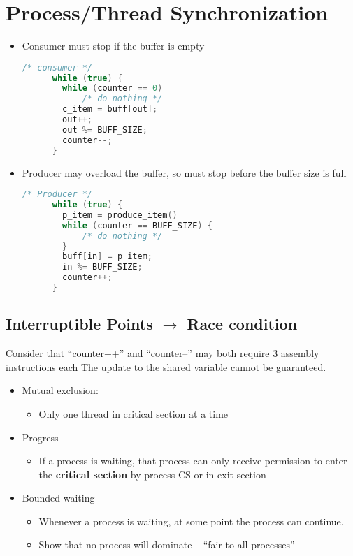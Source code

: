 \documentclass[11pt]{article}
\begin{document}
\section*{Process/Thread Synchronization}
\begin{itemize}
  \item Consumer must stop if the buffer is empty
    \begin{lstlisting}[language=c]
      /* consumer */
      while (true) {
      	while (counter == 0)
        	/* do nothing */
      	c_item = buff[out];
      	out++;
      	out %= BUFF_SIZE;
      	counter--;
      }
    \end{lstlisting}
  \item Producer may overload the buffer,
  so must stop before the buffer size is full
    \begin{lstlisting}[language=c]
      /* Producer */
      while (true) {
        p_item = produce_item()
        while (counter == BUFF_SIZE) {
        	/* do nothing */
        }
        buff[in] = p_item;
        in %= BUFF_SIZE;
        counter++;
      }
    \end{lstlisting}
\end{itemize}

\subsection*{Interruptible Points $\rightarrow$ Race condition}
Consider that “counter++” and “counter--” may both require 3 assembly instructions each
The update to the shared variable cannot be guaranteed.
\begin{itemize}
  \item Mutual exclusion:
  \begin{itemize}
    \item Only one thread in critical section at a time
  \end{itemize}
  \item Progress
  \begin{itemize}
    \item If a process is waiting, that process can only receive permission to
    enter the \textbf{critical section} by process CS or in exit section
  \end{itemize}
  \item Bounded waiting
  \begin{itemize}
    \item Whenever a process is waiting, at some point
    the process can continue.
    \item Show that no process will dominate – “fair to all processes”
  \end{itemize}
\end{itemize}
\end{document}
